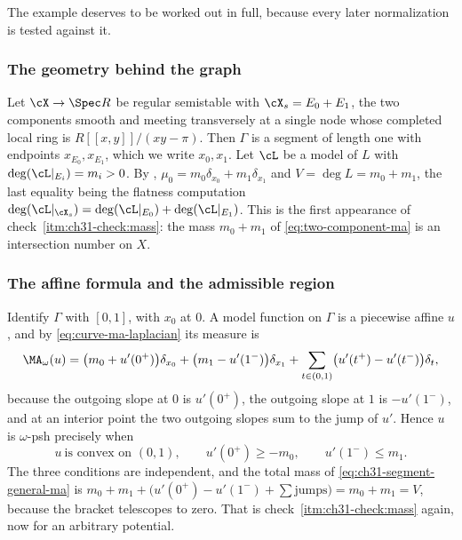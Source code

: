 The example deserves to be worked out in full, because every later
normalization is tested against it.

\subsubsection*{The geometry behind the graph}

Let \(\cX\to\Spec R\) be regular semistable with
\(\cX_s=E_0+E_1\), the two components smooth and meeting transversely at a
single node whose completed local ring is \(R[[x,y]]/(xy-\pi)\).  Then
\(\Gamma\) is a segment of length one with endpoints \(x_{E_0},x_{E_1}\),
which we write \(x_0,x_1\).  Let \(\cL\) be a model of \(L\) with
\(\deg(\cL|_{E_i})=m_i>0\).  By ,
\(\mu_0=m_0\delta_{x_0}+m_1\delta_{x_1}\) and
\(V=\deg L=m_0+m_1\), the last equality being the flatness computation
\(\deg(\cL|_{\cX_s})=\deg(\cL|_{E_0})+\deg(\cL|_{E_1})\).  This is the
first appearance of check~\cref{itm:ch31-check:mass}: the mass \(m_0+m_1\)
of \eqref{eq:two-component-ma} is an intersection number on \(X\).

\subsubsection*{The affine formula and the admissible region}

Identify \(\Gamma\) with \([0,1]\), with \(x_0\) at \(0\).  A model function
on \(\Gamma\) is a piecewise affine \(u\), and by
\eqref{eq:curve-ma-laplacian} its measure is
\begin{equation}
\label{eq:ch31-segment-general-ma}
 \MA_\omega(u)
 =\bigl(m_0+u'(0^+)\bigr)\delta_{x_0}
  +\bigl(m_1-u'(1^-)\bigr)\delta_{x_1}
  +\sum_{t\in(0,1)}\bigl(u'(t^+)-u'(t^-)\bigr)\delta_t ,
\end{equation}
because the outgoing slope at \(0\) is \(u'(0^+)\), the outgoing slope at
\(1\) is \(-u'(1^-)\), and at an interior point the two outgoing slopes sum
to the jump of \(u'\).  Hence \(u\) is \(\omega\)-psh precisely when
\begin{equation}
\label{eq:ch31-segment-psh}
 u\ \text{is convex on }(0,1),
 \qquad u'(0^+)\geq-m_0,
 \qquad u'(1^-)\leq m_1 .
\end{equation}
The three conditions are independent, and the total mass of
\eqref{eq:ch31-segment-general-ma} is
\(m_0+m_1+\bigl(u'(0^+)-u'(1^-)+\sum\text{jumps}\bigr)=m_0+m_1=V\), because
the bracket telescopes to zero.  That is
check~\cref{itm:ch31-check:mass} again, now for an arbitrary potential.

